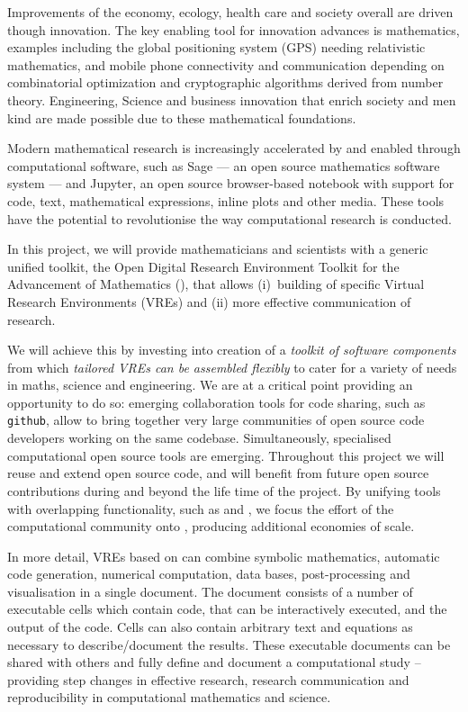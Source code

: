 Improvements of the economy, ecology, health care and society overall
are driven though innovation. The key enabling tool for innovation
advances is mathematics, examples including the global positioning
system (GPS) needing relativistic mathematics, and mobile phone
connectivity and communication depending on combinatorial optimization
and cryptographic algorithms derived from number theory. Engineering,
Science and business innovation that enrich society and men kind are
made possible due to these mathematical foundations.

Modern mathematical research is increasingly accelerated by and
enabled through computational software, such as Sage --- an open source
mathematics software system --- and Jupyter, an open source browser-based
notebook with support for code, text, mathematical expressions, inline
plots and other media. These tools have the potential to
revolutionise the way computational research is conducted. 

In this project, we will provide mathematicians and scientists with a
generic unified toolkit, the Open Digital Research Environment Toolkit
for the Advancement of Mathematics (\TheProject), that allows
(i)~building of specific Virtual Research Environments (VREs) and (ii)
more effective communication of research.


We will achieve this by investing into creation of a \emph{toolkit of
  software components} from which \emph{tailored VREs can be assembled
  flexibly} to cater for a variety of needs in maths, science and
engineering.  We are at a critical point providing an opportunity to
do so: emerging collaboration tools for code sharing, such as \texttt{github},
allow to bring together very large communities of open source code developers
working on the same codebase. Simultaneously, specialised
computational open source tools are emerging. Throughout this project
we will reuse and extend open source code, and \TheProject will benefit
from future open source contributions during and beyond the life time
of the project. By unifying tools with overlapping functionality, such as \Jupyter and \Sage, we
focus the effort of the computational community onto \TheProject, producing additional economies of scale. 

In more detail, VREs based on \TheProject can combine symbolic
mathematics, automatic code generation, numerical computation, data
bases, post-processing and visualisation in a single document. The
document consists of a number of executable cells which contain code,
that can be interactively executed, and the output of the code. Cells
can also contain arbitrary text and equations as necessary to
describe/document the results. These executable documents can be
shared with others and fully define and document a computational study
-- providing step changes in effective research, research
communication and reproducibility in computational mathematics and science. 


